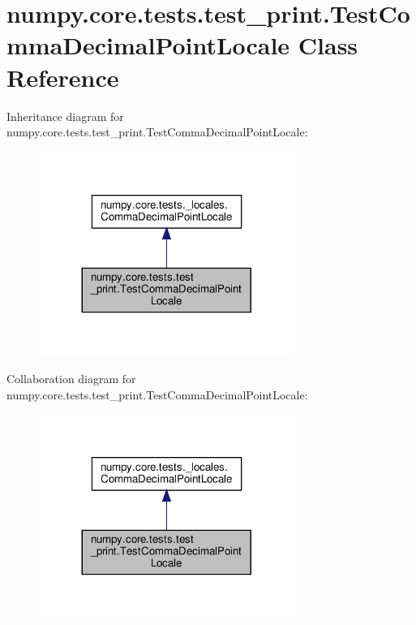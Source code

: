 \hypertarget{classnumpy_1_1core_1_1tests_1_1test__print_1_1TestCommaDecimalPointLocale}{}\section{numpy.\+core.\+tests.\+test\+\_\+print.\+Test\+Comma\+Decimal\+Point\+Locale Class Reference}
\label{classnumpy_1_1core_1_1tests_1_1test__print_1_1TestCommaDecimalPointLocale}


Inheritance diagram for numpy.\+core.\+tests.\+test\+\_\+print.\+Test\+Comma\+Decimal\+Point\+Locale\+:
\nopagebreak
\begin{figure}[H]
\begin{center}
\leavevmode
\includegraphics[width=236pt]{classnumpy_1_1core_1_1tests_1_1test__print_1_1TestCommaDecimalPointLocale__inherit__graph}
\end{center}
\end{figure}


Collaboration diagram for numpy.\+core.\+tests.\+test\+\_\+print.\+Test\+Comma\+Decimal\+Point\+Locale\+:
\nopagebreak
\begin{figure}[H]
\begin{center}
\leavevmode
\includegraphics[width=236pt]{classnumpy_1_1core_1_1tests_1_1test__print_1_1TestCommaDecimalPointLocale__coll__graph}
\end{center}
\end{figure}
